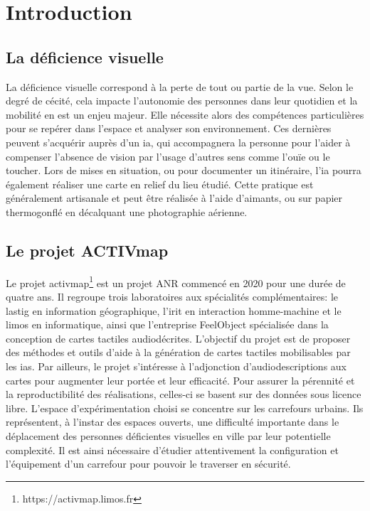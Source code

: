 \chapter*{Introduction}



\section*{La déficience visuelle}

La déficience visuelle correspond à la perte de tout ou partie de la vue. Selon le degré de cécité, cela impacte l’autonomie des personnes dans leur quotidien et la mobilité en est un enjeu majeur. Elle nécessite alors des compétences particulières pour se repérer dans l'espace et analyser son environnement. Ces dernières peuvent s'acquérir auprès d'un \gls{ia}, qui accompagnera la personne pour l'aider à compenser l'absence de vision par l'usage d'autres sens comme l'ouïe ou le toucher. Lors de mises en situation, ou pour documenter un itinéraire, l'\gls{ia} pourra également réaliser une carte en relief du lieu étudié. Cette pratique est généralement artisanale et peut être réalisée à l'aide d'aimants, ou sur papier thermogonflé en décalquant une photographie aérienne.


\section*{Le projet ACTIVmap}

Le projet \gls{activmap}\footnote{https://activmap.limos.fr} est un projet ANR commencé en 2020 pour une durée de quatre ans. Il regroupe trois laboratoires aux spécialités complémentaires: le \gls{lastig} en information géographique, l'\gls{irit} en interaction homme-machine et le \gls{limos} en informatique, ainsi que l'entreprise FeelObject spécialisée dans la conception de cartes tactiles audiodécrites. L'objectif du projet est de proposer des méthodes et outils d'aide à la génération de cartes tactiles mobilisables par les \glspl{ia}. Par ailleurs, le projet s'intéresse à l'adjonction d'audiodescriptions aux cartes pour augmenter leur portée et leur efficacité. Pour assurer la pérennité et la reproductibilité des réalisations, celles-ci se basent sur des données sous licence libre. L'espace d'expérimentation choisi se concentre sur les carrefours urbains. Ils représentent, à l'instar des espaces ouverts, une difficulté importante dans le déplacement des personnes déficientes visuelles en ville par leur potentielle complexité. Il est ainsi nécessaire d'étudier attentivement la configuration et l'équipement d'un carrefour pour pouvoir le traverser en sécurité.

